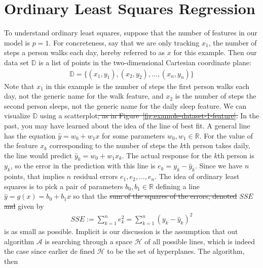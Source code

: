 \documentclass[12pt]{article}
\providecommand{\DIFaddtex}[1]{{\protect\color{blue}\uwave{#1}}} %
\providecommand{\DIFdeltex}[1]{{\protect\color{red}\sout{#1}}}                      %
\providecommand{\DIFaddbegin}{} %
\providecommand{\DIFaddend}{} %
\providecommand{\DIFdelbegin}{} %
\providecommand{\DIFdelend}{} %
\providecommand{\DIFadd}[1]{\texorpdfstring{\DIFaddtex{#1}}{#1}} %
\providecommand{\DIFdel}[1]{\texorpdfstring{\DIFdeltex{#1}}{}} %
\begin{document}
	\section{Ordinary Least Squares Regression}
	To understand ordinary least squares, suppose that the number of features
	in our model is $p=1$. For concreteness, say that we are only tracking
	$x_1$, the number of steps a person walks each day, hereby referred to
	as $x$ for this example. Then our data set $\mathbb{D}$ is a list of points
	in the two-dimensional Cartesian coordinate plane:
	\begin{align*}
		\mathbb{D} = \{
		(x_1,y_1), (x_2,y_2),\ldots,(x_n,y_n)
		\}
	\end{align*}
	Note that $x_1$ in this example is the number of steps the first person walks each day,
	not the generic name for the walk feature, and $x_2$ is the number of steps
	the second person sleeps, not the generic name for the daily sleep feature.
	We can visualize $\mathbb{D}$ using a scatterplot\DIFdelbegin \DIFdel{, as in Figure~\ref{fig:example-dataset-1-feature}.
	}%
\DIFdelend \DIFaddbegin \DIFadd{.
	}\DIFaddend In the past, you may have learned about the idea of the line of best fit.
	A general line has the equation $\hat{y} = w_0 + w_1x$ for some parameters
	$w_0,w_1\in\mathbb{R}$. For the value of the feature $x_k$ corresponding
	to the number of steps the $k$th person takes daily, the line would predict
	$\hat{y}_k = w_0+w_1x_k$. The actual response for the $k$th person is
	$y_k$, so the error in the prediction with this line is $e_k = y_k-\hat{y}_k$.
	Since we have $n$ points, that implies $n$ residual errors $e_1,e_2,\ldots,e_n$.
	The idea of ordinary least squares is to pick a pair of parameters
	$b_0,b_1\in \mathbb{R}$ defining a line $\hat{y}=g(x)=b_0+b_1x$ so that
	the \DIFdelbegin \DIFdel{sum of the squares of the errors, denoted }\DIFdelend $SSE$ \DIFdelbegin \DIFdel{and }\DIFdelend given by
	\begin{align*}
		SSE := \sum_{k=1}^{n}e_k^2 = \sum_{k=1}^{n}(y_k-\hat{y}_k)^2
	\end{align*}
	 is as small as possible. Implicit is our discussion is the assumption that
	 out algorithm $\mathcal{A}$ is searching through a space $\mathcal{H}$ of all
	 possible lines, which is indeed the case since earlier de fined
	 $\mathcal{H}$ to be the set of hyperplanes. The algorithm, then
\end{document}
